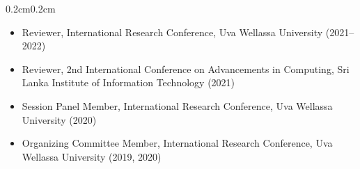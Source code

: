 \documentclass[10pt, letterpaper]{article}
\newenvironment{highlights}{%
    \begin{itemize}[topsep=0.08cm, parsep=0.08cm, partopsep=0pt,
                    itemsep=0pt, leftmargin=0.4cm + 10pt]
}{\end{itemize}}
\newenvironment{onecolentry}{%
    \begin{adjustwidth}{0.2cm}{0.2cm}
}{\end{adjustwidth}}
\begin{document}
\begin{onecolentry}
\begin{highlights}
        \item Reviewer, International Research Conference, Uva Wellassa University
              (2021--2022)
        \item Reviewer, 2nd International Conference on Advancements in Computing,
              Sri Lanka Institute of Information Technology (2021)
        \item Session Panel Member, International Research Conference,
              Uva Wellassa University (2020)
        \item Organizing Committee Member, International Research Conference,
              Uva Wellassa University (2019, 2020)
    \end{highlights}
\end{onecolentry}
\vspace{0.18cm}

\end{document}
